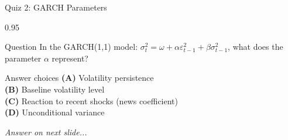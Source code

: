 \documentclass[9pt, aspectratio=169, t]{beamer}
\begin{document}
\begin{frame}{Quiz 2: GARCH Parameters}
    \begin{cminipage}{0.95\textwidth}
    \begin{alertblock}{Question}
        In the GARCH(1,1) model: $\sigma_t^2 = \omega + \alpha \varepsilon_{t-1}^2 + \beta \sigma_{t-1}^2$, what does the parameter $\alpha$ represent?
    \end{alertblock}

    \vspace{0.4cm}

    \begin{block}{Answer choices}
        \textcolor{MainBlue}{\textbf{(A)}} Volatility persistence\\[3pt]
        \textcolor{MainBlue}{\textbf{(B)}} Baseline volatility level\\[3pt]
        \textcolor{MainBlue}{\textbf{(C)}} Reaction to recent shocks (news coefficient)\\[3pt]
        \textcolor{MainBlue}{\textbf{(D)}} Unconditional variance
    \end{block}

    \vspace{0.5cm}

    \begin{center}
        \textit{Answer on next slide...}
    \end{center}
    \end{cminipage}
\end{frame}
\end{document}
